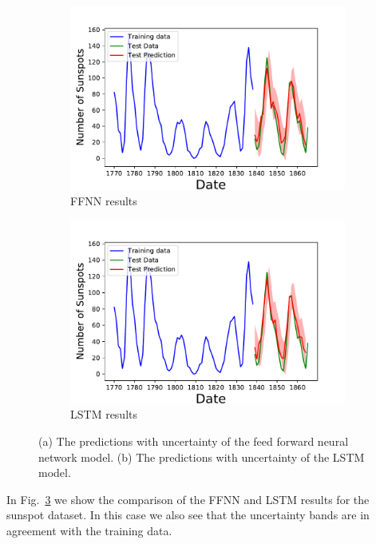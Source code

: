 \documentclass[10pt,a4paper]{article}
\begin{document}
\begin{figure}[h]
\centering
\begin{subfigure}{.5\textwidth}
  \centering
  \includegraphics[scale=0.41]{Sunspot_Forecast_NN.pdf}
  \caption{FFNN results}
  \label{fig:NN results sunspots}
\end{subfigure}%
\begin{subfigure}{.5\textwidth}
  \centering
  \includegraphics[scale=0.41]{Sunspot_Forecast_LSTN.pdf}
  \caption{LSTM results}
  \label{fig:LSTM results sunspots}
\end{subfigure}
\caption{(a) The predictions with uncertainty of the feed forward neural network model. (b) The predictions with uncertainty of the LSTM model.}
\label{fig:results sunspots}
\end{figure}
In Fig.~\ref{fig:results sunspots} we show the comparison of the FFNN and LSTM results for the sunspot dataset. In this case we also see that the uncertainty bands are in agreement with the training data.
\end{document}

